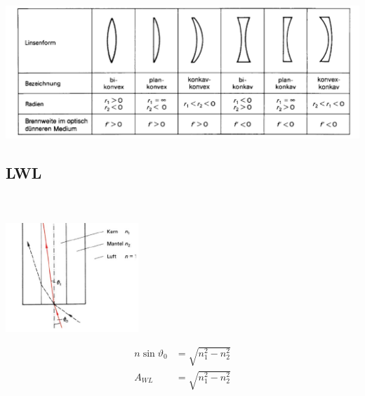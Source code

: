 \begin{center}
\includegraphics[width=150mm,keepaspectratio=true]{physik/png/optik3.png}
\end{center}

\subsection{LWL}

\begin{boxleft}
\\\\
\includegraphics[width=50mm,keepaspectratio=true]{physik/png/optik4.png}
\end{boxleft}\begin{boxrightshaded}
\begin{align*}
n\sin\vartheta_0&=\sqrt{n_1^2-n_2^2}\\
A_{WL}&=\sqrt{n_1^2-n_2^2}
\end{align*}
\end{boxrightshaded}
